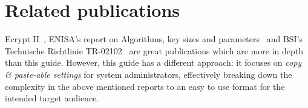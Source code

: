 \section{Related publications}
\label{section:relatedPublications}


Ecrypt II~\cite{ii2011ecrypt}, ENISA's report on Algorithms, key sizes and
parameters~\cite{ENISA2013} and BSI's Technische Richtlinie
TR-02102~\cite{TR02102} are great publications which are more in depth than
this guide. However, this guide has a different approach: it focuses on
\emph{copy \& paste-able settings} for system administrators, effectively
breaking down the complexity in the above mentioned reports to an easy to use
format for the intended target audience.




